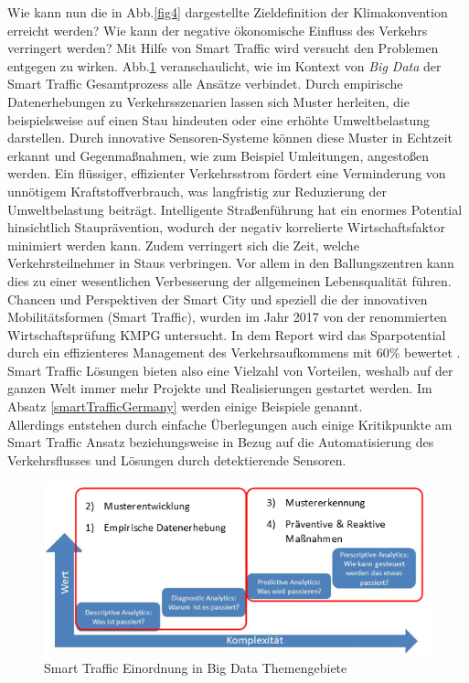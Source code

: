 Wie kann nun die in Abb.\ref{fig4} dargestellte Zieldefinition der Klimakonvention erreicht werden? Wie kann der negative ökonomische Einfluss des Verkehrs verringert werden? Mit Hilfe von Smart Traffic wird versucht den Problemen entgegen zu wirken. Abb.\ref{fig13} veranschaulicht, wie im Kontext von \emph{Big Data} der Smart Traffic Gesamtprozess alle Ansätze verbindet. Durch empirische Datenerhebungen zu Verkehrsszenarien lassen sich Muster herleiten, die beispielsweise auf einen Stau hindeuten oder eine erhöhte Umweltbelastung darstellen. Durch innovative Sensoren-Systeme können diese Muster in Echtzeit erkannt und Gegenmaßnahmen, wie zum Beispiel Umleitungen, angestoßen werden.
Ein flüssiger, effizienter Verkehrsstrom fördert eine Verminderung von unnötigem Kraftstoffverbrauch, was langfristig zur Reduzierung der Umweltbelastung beiträgt. Intelligente Straßenführung hat ein enormes Potential hinsichtlich Stauprävention, wodurch der negativ korrelierte Wirtschaftsfaktor minimiert werden kann. Zudem verringert sich die Zeit, welche Verkehrsteilnehmer in Staus verbringen. Vor allem in den Ballungszentren kann dies zu einer wesentlichen Verbesserung der allgemeinen Lebensqualität führen. Chancen und Perspektiven der Smart City und speziell die der innovativen Mobilitätsformen (Smart Traffic), wurden im Jahr 2017 von der renommierten Wirtschaftsprüfung KMPG untersucht. In dem Report wird das Sparpotential durch ein effizienteres Management des Verkehrsaufkommens mit 60\% bewertet \citep[vgl.][]{KPMG.2017}. Smart Traffic Lösungen bieten also eine Vielzahl von Vorteilen, weshalb auf der ganzen Welt immer mehr Projekte und Realisierungen gestartet werden. Im Absatz \ref{smartTrafficGermany} werden einige Beispiele genannt.\\ 
Allerdings entstehen durch einfache Überlegungen auch einige Kritikpunkte am Smart Traffic Ansatz beziehungsweise in Bezug auf die Automatisierung des Verkehrsflusses und Lösungen durch detektierende Sensoren. 

\begin{figure}[ht]
\begin{center}
	\includegraphics[scale=0.5]{images/SmartTrafficEinordnungBigDataThemengebiete.png}
	\caption{Smart Traffic Einordnung in Big Data Themengebiete \citep[in Anlehnung an][]{RyoheiFujimaki.2016}}
	\label{fig13}
\end{center}

\end{figure}

